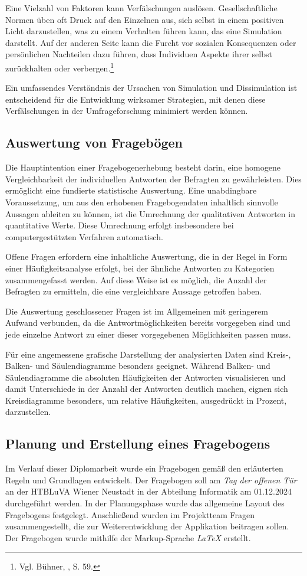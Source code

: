 Eine Vielzahl von Faktoren kann Verfälschungen auslösen. Gesellschaftliche Normen üben oft Druck auf den Einzelnen aus,
sich selbst in einem positiven Licht darzustellen, was zu einem Verhalten führen kann, das eine Simulation darstellt. Auf
der anderen Seite kann die Furcht vor sozialen Konsequenzen oder persönlichen Nachteilen dazu führen, dass Individuen
Aspekte ihrer selbst zurückhalten oder verbergen.\footnote{Vgl. Bühner, \cite{Einfuehrung in die TEst und Fragebogenkonstruktion}, S. 59.}

Ein umfassendes Verständnis der Ursachen von Simulation und Dissimulation ist entscheidend für die Entwicklung wirksamer
Strategien, mit denen diese Verfälschungen in der Umfrageforschung minimiert werden können.

\subsection{Auswertung von Fragebögen}
Die Hauptintention einer Fragebogenerhebung besteht darin, eine homogene Vergleichbarkeit der individuellen Antworten der
Befragten zu gewährleisten. Dies ermöglicht eine fundierte statistische Auswertung. Eine unabdingbare Voraussetzung, um
aus den erhobenen Fragebogendaten inhaltlich sinnvolle Aussagen ableiten zu können, ist die Umrechnung der qualitativen
Antworten in quantitative Werte. Diese Umrechnung erfolgt insbesondere bei computergestützten Verfahren automatisch.

Offene Fragen erfordern eine inhaltliche Auswertung, die in der Regel in Form einer Häufigkeitsanalyse erfolgt, bei der
ähnliche Antworten zu Kategorien zusammengefasst werden. Auf diese Weise ist es möglich, die Anzahl der Befragten zu
ermitteln, die eine vergleichbare Aussage getroffen haben.

Die Auswertung geschlossener Fragen ist im Allgemeinen mit geringerem Aufwand verbunden, da die Antwortmöglichkeiten
bereits vorgegeben sind und jede einzelne Antwort zu einer dieser vorgegebenen Möglichkeiten passen muss.

Für eine angemessene grafische Darstellung der analysierten Daten sind Kreis-, Balken- und Säulendiagramme besonders
geeignet. Während Balken- und Säulendiagramme die absoluten Häufigkeiten der Antworten visualisieren und damit Unterschiede
in der Anzahl der Antworten deutlich machen, eignen sich Kreisdiagramme besonders, um relative Häufigkeiten, ausgedrückt
in Prozent, darzustellen.

\subsection{Planung und Erstellung eines Fragebogens}
Im Verlauf dieser Diplomarbeit wurde ein Fragebogen gemäß den erläuterten Regeln und Grundlagen entwickelt. Der Fragebogen
soll am \textit{Tag der offenen Tür} an der HTBLuVA Wiener Neustadt in der Abteilung Informatik am 01.12.2024 durchgeführt
werden. In der Planungsphase wurde das allgemeine Layout des Fragebogens festgelegt. Anschließend wurden im Projektteam
Fragen zusammengestellt, die zur Weiterentwicklung der Applikation beitragen sollen. Der Fragebogen wurde mithilfe der
Markup-Sprache \textit{LaTeX} erstellt.

